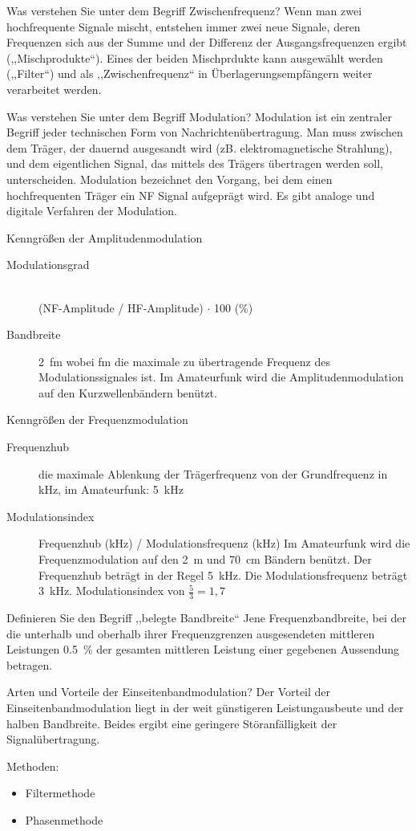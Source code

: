 \documentclass[avery5371,grid,frame,a4paper]{flashcards}
\newcommand{\card}[3]{
  \begin{flashcard}[{\chap} -- #1]{#2}#3\end{flashcard}
}
\begin{document}
\card{15}{Was verstehen Sie unter dem Begriff Zwischenfrequenz?}{
  Wenn man zwei hochfrequente Signale mischt, entstehen immer zwei neue Signale, deren Frequenzen sich aus der Summe und der Differenz der Ausgangsfrequenzen ergibt (,,Mischprodukte``). Eines der beiden Mischprdukte kann ausgewählt werden (,,Filter``) und als ,,Zwischenfrequenz`` in Überlagerungsempfängern weiter verarbeitet werden.
}
\card{16}{Was verstehen Sie unter dem Begriff Modulation?}{
  Modulation ist ein zentraler Begriff jeder technischen Form von Nachrichtenübertragung. Man muss zwischen dem Träger, der dauernd ausgesandt wird (zB. elektromagnetische Strahlung), und dem eigentlichen Signal, das mittels des Trägers übertragen werden soll, unterscheiden. Modulation bezeichnet den Vorgang, bei dem einen hochfrequenten Träger ein NF Signal aufgeprägt wird. Es gibt analoge und digitale Verfahren der Modulation.}
\card{17}{Kenngrößen der Amplitudenmodulation}{
  \begin{description}
    \item[Modulationsgrad] \hfill{} \\ (NF-Amplitude / HF-Amplitude) $\cdot$ 100 (\%)
    \item[Bandbreite]
      2~fm wobei fm die maximale zu übertragende Frequenz des Modulationssignales ist.
      Im Amateurfunk wird die Amplitudenmodulation auf den Kurzwellenbändern benützt.
  \end{description}
}
\card{18}{Kenngrößen der Frequenzmodulation}{
  \begin{description}
    \item[Frequenzhub] die maximale Ablenkung der Trägerfrequenz von der Grundfrequenz in kHz,
      im Amateurfunk: 5~kHz
    \item[Modulationsindex]
      Frequenzhub (kHz) / Modulationsfrequenz (kHz)
      Im Amateurfunk wird die Frequenzmodulation auf den 2~m und \SI{70}{\centi\metre} Bändern benützt.
      Der Frequenzhub beträgt in der Regel 5~kHz. Die Modulationsfrequenz beträgt 3~kHz.
      Modulationsindex von $\frac53 = 1,7$
  \end{description}
}
\card{19}{Definieren Sie den Begriff ,,belegte Bandbreite``}{
  Jene Frequenzbandbreite, bei der die unterhalb und oberhalb ihrer Frequenzgrenzen ausgesendeten mittleren Leistungen \SI{0,5}{\percent} der gesamten mittleren Leistung einer gegebenen Aussendung betragen.
}
\card{20}{Arten und Vorteile der Einseitenbandmodulation?}{
  Der Vorteil der Einseitenbandmodulation liegt in der weit günstigeren Leistungausbeute und der halben Bandbreite. Beides ergibt eine geringere Störanfälligkeit der Signalübertragung.

  Methoden:
  \begin{itemize}
    \item Filtermethode
    \item Phasenmethode
  \end{itemize}
}
\end{document}
